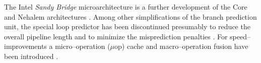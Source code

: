 
The Intel\TReg{} \emph{Sandy Bridge} microarchitecture is a further development
of the Core and Nehalem architectures \cite{fog11}. Among other simplifications
of the branch prediction unit, the special loop predictor has been discontinued
presumably to reduce the overall pipeline length and to minimize the
misprediction penalties \cite{fog11}. For speed--improvements a micro--operation
($\mu$op) cache and macro--operation fusion have been introduced \cite{fog11}.

